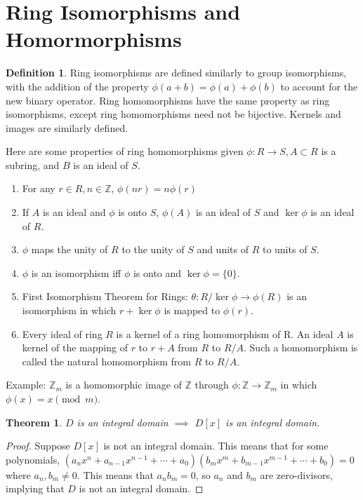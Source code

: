 \documentclass{article}
\theoremstyle{definition}
\newtheorem{definition}{Definition}
\theoremstyle{plain}
\newtheorem{theorem}{Theorem}
\theoremstyle{corollary}
\theoremstyle{lemma}
\begin{document}
\section{Ring Isomorphisms and Homormorphisms}

\begin{definition}
    Ring isomorphisms are defined similarly to group isomorphisms, with the addition of the property $\phi(a+b)=\phi(a)+\phi(b)$ to account for the new binary operator. Ring homomorphisms have the same property as ring isomorphisms, except ring homomorphisms need not be bijective. Kernels and images are similarly defined.
\end{definition}

Here are some properties of ring homomorphisms given $\phi:R\rightarrow S,A\subset R$ is a subring, and $B$ is an ideal of $S$.
\begin{enumerate}
    \item For any $r\in R,n\in\mathbb{Z}$, $\phi(nr)=n\phi(r)$
    \item If $A$ is an ideal and $\phi$ is onto $S$, $\phi(A)$ is an ideal of $S$ and $\ker\phi$ is an ideal of $R$.
    \item $\phi$ maps the unity of $R$ to the unity of $S$ and units of $R$ to units of $S$.
    \item $\phi$ is an isomorphism iff $\phi$ is onto and $\ker\phi=\{0\}$.
    \item First Isomorphism Theorem for Rings: $\theta:R/\ker\phi\rightarrow\phi(R)$ is an isomorphism in which $r+\ker\phi$ is mapped to $\phi(r)$.
    \item Every ideal of ring $R$ is a kernel of a ring homomorphism of R. An ideal $A$ is kernel of the mapping of $r$ to $r+A$ from $R$ to $R/A$. Such a homomorphism is called the natural homomorphism from $R$ to $R/A$.
\end{enumerate}

Example: $\mathbb{Z}_m$ is a homomorphic image of $\mathbb{Z}$ through $\phi:\mathbb{Z}\rightarrow\mathbb{Z}_m$ in which $\phi(x)=x\pmod m$.

\begin{theorem}
    $D$ is an integral domain $\implies$ $D[x]$ is an integral domain.
\end{theorem}

\begin{proof}
    Suppose $D[x]$ is not an integral domain. This means that for some polynomials, $(a_nx^n+a_{n-1}x^{n-1}+\cdots+a_0)(b_mx^m+b_{m-1}x^{m-1}+\cdots+b_0)=0$ where $a_n,b_m\neq0$. This means that $a_nb_m=0$, so $a_n$ and $b_m$ are zero-divisors, implying that $D$ is not an integral domain.
\end{proof}
\end{document}

